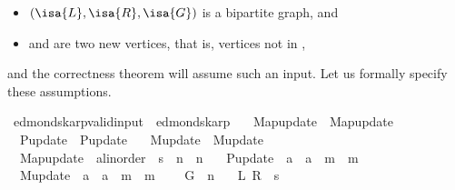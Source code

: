 \begin{isabellebody}
\begin{isamarkuptext}
%
\begin{itemize}%
\item $(\isa{L},\isa{R},\isa{G})$ is a bipartite graph, and

\item {} and  are two new vertices, that is, vertices not in ,%
\end{itemize}


and the correctness theorem will assume such an input. Let us formally specify these assumptions.%
\end{isamarkuptext}\isamarkuptrue%
\isamarkupfalse%
\ edmonds{\isacharunderscore}{\kern0pt}karp{\isacharunderscore}{\kern0pt}valid{\isacharunderscore}{\kern0pt}input\ {\isacharequal}{\kern0pt}\ edmonds{\isacharunderscore}{\kern0pt}karp\ \isanewline
\ \ Map{\isacharunderscore}{\kern0pt}update\ {\isacharequal}{\kern0pt}\ Map{\isacharunderscore}{\kern0pt}update\ \isanewline
\ \ P{\isacharunderscore}{\kern0pt}update\ {\isacharequal}{\kern0pt}\ P{\isacharunderscore}{\kern0pt}update\ \isanewline
\ \ M{\isacharunderscore}{\kern0pt}update\ {\isacharequal}{\kern0pt}\ M{\isacharunderscore}{\kern0pt}update\ \isanewline
\ \ Map{\isacharunderscore}{\kern0pt}update\ {\isacharcolon}{\kern0pt}{\isacharcolon}{\kern0pt}\ {\isachardoublequoteopen}{\isacharprime}{\kern0pt}a{\isacharcolon}{\kern0pt}{\isacharcolon}{\kern0pt}linorder\ {\isasymRightarrow}\ {\isacharprime}{\kern0pt}s\ {\isasymRightarrow}\ {\isacharprime}{\kern0pt}n\ {\isasymRightarrow}\ {\isacharprime}{\kern0pt}n{\isachardoublequoteclose}\ \isanewline
\ \ P{\isacharunderscore}{\kern0pt}update\ {\isacharcolon}{\kern0pt}{\isacharcolon}{\kern0pt}\ {\isachardoublequoteopen}{\isacharprime}{\kern0pt}a\ {\isasymRightarrow}\ {\isacharprime}{\kern0pt}a\ {\isasymRightarrow}\ {\isacharprime}{\kern0pt}m\ {\isasymRightarrow}\ {\isacharprime}{\kern0pt}m{\isachardoublequoteclose}\ \isanewline
\ \ M{\isacharunderscore}{\kern0pt}update\ {\isacharcolon}{\kern0pt}{\isacharcolon}{\kern0pt}\ {\isachardoublequoteopen}{\isacharprime}{\kern0pt}a\ {\isasymRightarrow}\ {\isacharprime}{\kern0pt}a\ {\isasymRightarrow}\ {\isacharprime}{\kern0pt}m\ {\isasymRightarrow}\ {\isacharprime}{\kern0pt}m{\isachardoublequoteclose}\ {\isacharplus}{\kern0pt}\isanewline
\ \ \ G\ {\isacharcolon}{\kern0pt}{\isacharcolon}{\kern0pt}\ {\isacharprime}{\kern0pt}n\isanewline
\ \ \ L\ R\ {\isacharcolon}{\kern0pt}{\isacharcolon}{\kern0pt}\ {\isacharprime}{\kern0pt}s\isanewline

\end{isabellebody}

